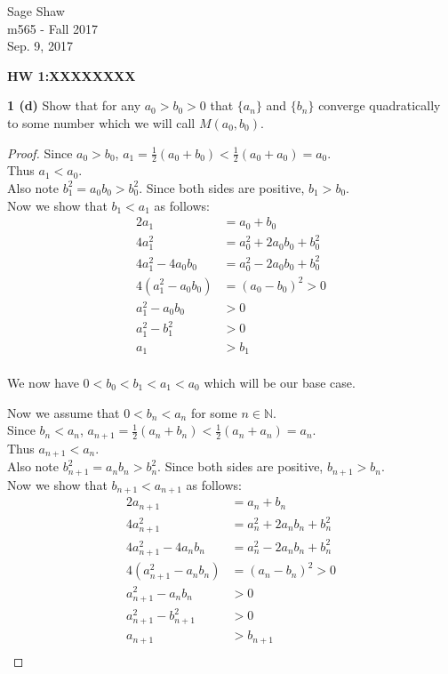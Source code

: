 \documentclass[12pt]{article}
\begin{document}
\thispagestyle{empty}
	
\begin{flushright}
Sage Shaw \\
m565 - Fall 2017 \\
Sep. 9, 2017
\end{flushright}
	
{\large \textbf{HW 1:XXXXXXXX}}\bigbreak

\hspace{-4 ex}\textbf{1 (d) } Show that for any $a_{0} > b_{0} > 0$ that $\{a_{n}\}$ and $\{b_{n}\}$ converge quadratically to
	some number which we will call $M(a_{0}, b_{0})$. \\
	
	\begin{proof}
		Since $a_{0} > b_{0}$, $a_{1} = \frac{1}{2} (a_{0}+b_{0}) < \frac{1}{2} (a_{0}+a_{0}) = a_{0}$. \\
		Thus $a_{1} < a_{0}$. \\
		Also note $b_{1}^{2} = a_{0}b_{0} > b_{0}^{2}$. Since both sides are positive, $b_{1} > b_{0}$. \\
		Now we show that $b_1<a_1$ as follows:\\
		\begin{align*}
			2a_1 & = a_0 + b_0 \\
			4a_1^2 & = a_0^2 + 2a_0b_0 + b_0^2 \\
			4a_1^2 - 4a_0b_0 & = a_0^2 - 2a_0b_0 + b_0^2 \\
			4(a_1^2 - a_0b_0) & = (a_0 - b_0)^2 > 0\\
			a_1^2 - a_0b_0 & > 0 \\
			a_1^2 - b_1^2 & > 0\\
			a_1 & > b_1\\
		\end{align*}
				
		We now have $0 < b_{0}< b_1 <a_{1} < a_{0}$ which will be our base case. \bigbreak
		
		Now we assume that $0< b_n <a_{n}$ for some $n \in \mathbb{N}$.\\
		Since $b_n < a_n$, $a_{n+1} = \frac{1}{2} (a_{n}+b_{n}) < \frac{1}{2} (a_{n}+a_{n}) = a_{n}$. \\
		Thus $a_{n+1} < a_{n}$. \\
		Also note $b_{n+1}^{2} = a_{n}b_{n} > b_{n}^{2}$. Since both sides are positive, $b_{n+1} > b_{n}$. \\
		Now we show that $b_{n+1}<a_{n+1}$ as follows:\\
		\begin{align*}
		2a_{n+1} & = a_n + b_n \\
		4a_{n+1}^2 & = a_n^2 + 2a_nb_n + b_n^2 \\
		4a_{n+1}^2 - 4a_nb_n & = a_n^2 - 2a_nb_n + b_n^2 \\
		4(a_{n+1}^2 - a_nb_n) & = (a_n - b_n)^2 > 0\\
		a_{n+1}^2 - a_nb_n & > 0 \\
		a_{n+1}^2 - b_{n+1}^2 & > 0\\
		a_{n+1} & > b_{n+1}\\
		\end{align*}
		

\end{proof}
\end{document}
